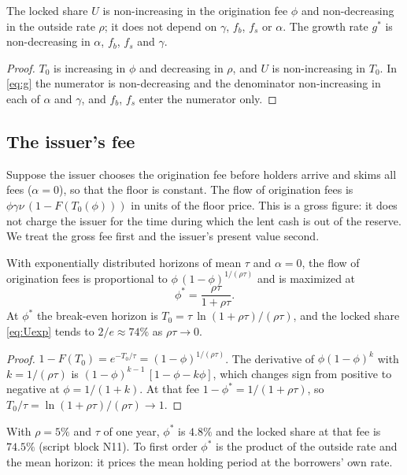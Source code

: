 \begin{corollary}\label{cor:statics}
The locked share $U$ is non-increasing in the origination fee $\phi$ and non-decreasing in the outside rate $\rho$; it does not depend on $\gamma$, $f_b$, $f_s$ or $\alpha$. The growth rate $g^\ast$ is non-decreasing in $\alpha$, $f_b$, $f_s$ and $\gamma$.
\end{corollary}
\begin{proof}
$T_0$ is increasing in $\phi$ and decreasing in $\rho$, and $U$ is non-increasing in $T_0$. In \eqref{eq:g} the numerator is non-decreasing and the denominator non-increasing in each of $\alpha$ and $\gamma$, and $f_b$, $f_s$ enter the numerator only.
\end{proof}

\subsection{The issuer's fee}\label{sec:fee}

Suppose the issuer chooses the origination fee before holders arrive and skims all fees ($\alpha=0$), so that the floor is constant. The flow of origination fees is $\phi\gamma\nu\,(1-F(T_0(\phi)))$ in units of the floor price. This is a gross figure: it does not charge the issuer for the time during which the lent cash is out of the reserve. We treat the gross fee first and the issuer's present value second.

\begin{proposition}\label{prop:fee}
With exponentially distributed horizons of mean $\tau$ and $\alpha=0$, the flow of origination fees is proportional to $\phi\,(1-\phi)^{1/(\rho\tau)}$ and is maximized at
\[
\phi^\ast=\frac{\rho\tau}{1+\rho\tau}.
\]
At $\phi^\ast$ the break-even horizon is $T_0=\tau\,\ln(1+\rho\tau)/(\rho\tau)$, and the locked share \eqref{eq:Uexp} tends to $2/e\approx74\%$ as $\rho\tau\to0$.
\end{proposition}
\begin{proof}
$1-F(T_0)=e^{-T_0/\tau}=(1-\phi)^{1/(\rho\tau)}$. The derivative of $\phi(1-\phi)^k$ with $k=1/(\rho\tau)$ is $(1-\phi)^{k-1}\,[1-\phi-k\phi]$, which changes sign from positive to negative at $\phi=1/(1+k)$. At that fee $1-\phi^\ast=1/(1+\rho\tau)$, so $T_0/\tau=\ln(1+\rho\tau)/(\rho\tau)\to1$.
\end{proof}

With $\rho=5\%$ and $\tau$ of one year, $\phi^\ast$ is $4.8\%$ and the locked share at that fee is $74.5\%$ (script block N11). To first order $\phi^\ast$ is the product of the outside rate and the mean horizon: it prices the mean holding period at the borrowers' own rate.

